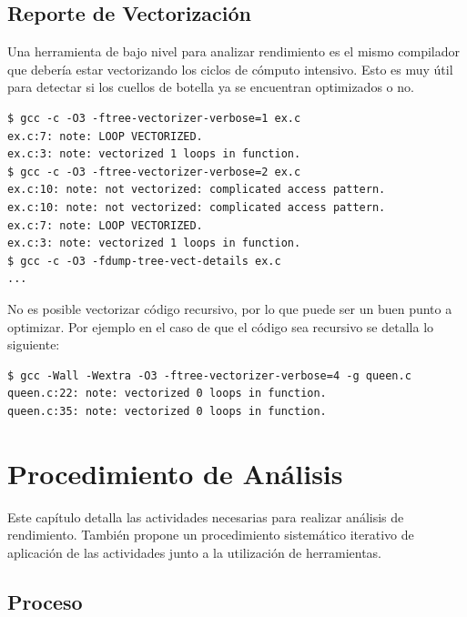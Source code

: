 \documentclass[a4paper]{report}
\begin{document}
\section{Reporte de Vectorización}

Una herramienta de bajo nivel para analizar rendimiento es el mismo compilador
que debería estar vectorizando los ciclos de cómputo intensivo. Esto es muy
útil para detectar si los cuellos de botella ya se encuentran optimizados o no.

\begin{lstlisting}
$ gcc -c -O3 -ftree-vectorizer-verbose=1 ex.c
ex.c:7: note: LOOP VECTORIZED.
ex.c:3: note: vectorized 1 loops in function.
$ gcc -c -O3 -ftree-vectorizer-verbose=2 ex.c
ex.c:10: note: not vectorized: complicated access pattern.
ex.c:10: note: not vectorized: complicated access pattern.
ex.c:7: note: LOOP VECTORIZED.
ex.c:3: note: vectorized 1 loops in function.
$ gcc -c -O3 -fdump-tree-vect-details ex.c
...
\end{lstlisting}

No es posible vectorizar código recursivo, por lo que puede ser un buen punto a
optimizar. Por ejemplo en el caso de que el código sea recursivo se detalla lo siguiente:

\begin{lstlisting}
$ gcc -Wall -Wextra -O3 -ftree-vectorizer-verbose=4 -g queen.c
queen.c:22: note: vectorized 0 loops in function.
queen.c:35: note: vectorized 0 loops in function.
\end{lstlisting}

\chapter{Procedimiento de Análisis}\label{chapter:procedure}

Este capítulo detalla las actividades necesarias para realizar análisis de rendimiento. También propone un procedimiento sistemático iterativo de aplicación de las actividades junto a la utilización de herramientas.

\section{Proceso}
\end{document}

